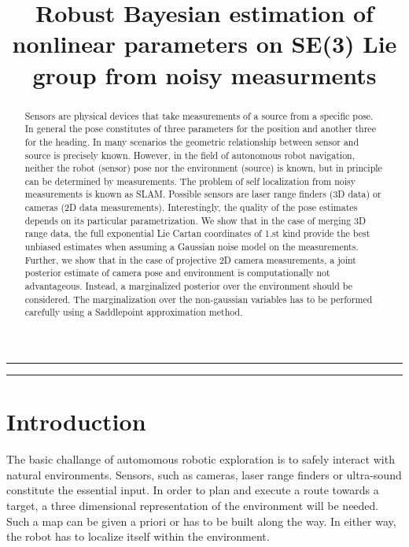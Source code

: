 \documentclass[conference]{IEEEtran}
\begin{document}
\title{Robust Bayesian estimation of nonlinear parameters on SE(3) Lie group from noisy measurments}
\author{
 }
\pagestyle{empty}

\maketitle

\hrule
\begin{abstract}
Sensors are physical devices that take measurements of a source
from a specific pose. In general the pose constitutes of three parameters for
the position and another three for the heading. In many scenarios the
geometric relationship between sensor and source is precisely known. However,
in the field of autonomous robot navigation, neither the robot (sensor) pose 
nor the environment (source) is known, but in principle can be determined by
measurements. The problem of self localization  from noisy measurements is known as SLAM.
Possible sensors are laser range finders (3D data)
or cameras (2D data measurements). Interestingly, the quality of the pose
estimates depends on its particular parametrization. We show that in the case of
merging 3D range data, the full exponential Lie Cartan coordinates of 1.st kind
provide the best unbiased estimates when assuming a Gaussian noise model on the
measurements. Further, we show that in the case of projective 2D camera measurements,
a joint posterior estimate of camera pose and environment is computationally
not advantageous. Instead, a marginalized posterior over the environment should
be considered. The marginalization over the non-gaussian variables has to be performed
carefully using a Saddlepoint approximation method.
\end{abstract}
\hrule

\section{Introduction}

The basic challange of automomous robotic exploration is to safely interact with
natural environments. Sensors, such as cameras, laser range finders or ultra-sound
constitute the essential input. In order to plan and execute a route towards a target,
a three dimensional representation of the environment will be needed. Such a map can
be given a priori or has to be built along the way. In either way, the robot has to
localize itself within the environment.
\end{document}
